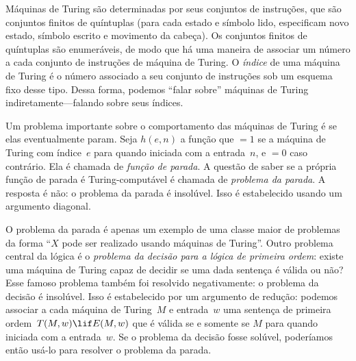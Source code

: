 Máquinas de Turing são determinadas por seus conjuntos de instruções, que são
conjuntos finitos de quíntuplas (para cada estado e símbolo lido, especificam
novo estado, símbolo escrito e movimento da cabeça). Os conjuntos finitos
de quíntuplas são enumeráveis, de modo que há uma maneira de associar um
número a cada conjunto de instruções de máquina de Turing. O \emph{índice} de
uma máquina de Turing é o número associado a seu conjunto de instruções
sob um esquema fixo desse tipo. Dessa forma, podemos ``falar sobre'' máquinas
de Turing indiretamente---falando sobre seus índices.

Um problema importante sobre o comportamento das máquinas de Turing é se
elas eventualmente param. Seja $h(e, n)$ a função que $= 1$ se a
máquina de Turing com índice~$e$ para quando iniciada com a entrada~$n$, e
$=0$ caso contrário. Ela é chamada de \emph{função de parada}. A questão
de saber se a própria função de parada é Turing-computável é chamada de
\emph{problema da parada}. A resposta é não: o problema da parada é
insolúvel. Isso é estabelecido usando um argumento diagonal.

O problema da parada é apenas um exemplo de uma classe maior de problemas
da forma ``$X$ pode ser realizado usando máquinas de Turing''. Outro
problema central da lógica é o \emph{problema da decisão para a lógica de
  primeira ordem}: existe uma máquina de Turing capaz de decidir se uma dada
sentença é válida ou não? Esse famoso problema também foi resolvido
negativamente: o problema da decisão é insolúvel. Isso é estabelecido por
um argumento de redução: podemos associar a cada máquina de Turing~$M$
e entrada~$w$ uma sentença de primeira ordem~$T(M, w) \lif E(M, w)$ que é
válida se e somente se $M$ para quando iniciada com a entrada~$w$. Se o
problema da decisão fosse solúvel, poderíamos então usá-lo para resolver o
problema da parada.
